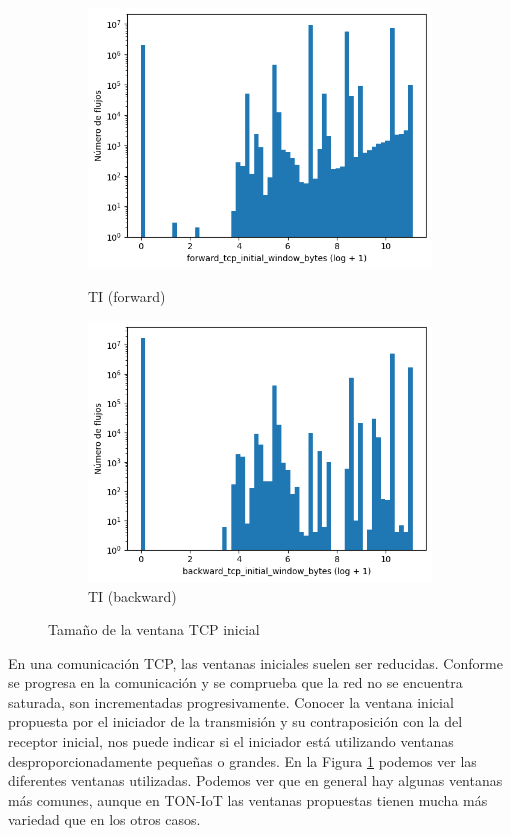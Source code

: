 \begin{figure}[H]
\begin{subfigure}[b]{0.26\textwidth}
        \includegraphics[width=\linewidth]{media/packet_pincer_toniot/forward_tcp_initial_window_bytes_log_x_log_y.png}
        \caption{TI (forward)}
        \includegraphics[width=\linewidth]{media/packet_pincer_toniot/backward_tcp_initial_window_bytes_log_x_log_y.png}
        \caption{TI (backward)}
    \end{subfigure}
       \caption{Tamaño de la ventana TCP inicial}
       \label{fig:packet_pincer_bidirectional_tcp_initial_window_bytes}
\end{figure}

En una comunicación TCP, las ventanas iniciales suelen ser reducidas. Conforme se progresa en la comunicación y se comprueba que la red no se encuentra saturada, son incrementadas progresivamente. Conocer la ventana inicial propuesta por el iniciador de la transmisión y su contraposición con la del receptor inicial, nos puede indicar si el iniciador está utilizando ventanas desproporcionadamente pequeñas o grandes. En la Figura \ref{fig:packet_pincer_bidirectional_tcp_initial_window_bytes} podemos ver las diferentes ventanas utilizadas. Podemos ver que en general hay algunas ventanas más comunes, aunque en TON-IoT las ventanas propuestas tienen mucha más variedad que en los otros casos.


